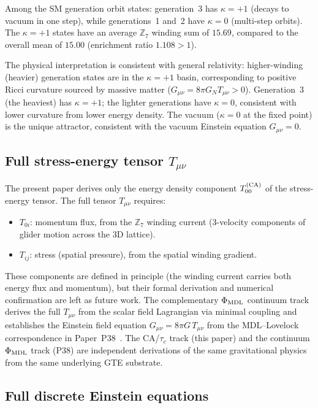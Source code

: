 \documentclass[11pt]{article}
\theoremstyle{remark}
\begin{document}
Among the SM generation orbit states:
generation~3 has $\kappa = +1$ (decays to vacuum in one step),
while generations~1 and~2 have $\kappa = 0$ (multi-step orbits).
The $\kappa = +1$ states have an average $\mathbb{Z}_7$ winding sum of
$15.69$, compared to the overall mean of $15.00$
(enrichment ratio $1.108 > 1$).

The physical interpretation is consistent with general relativity:
higher-winding (heavier) generation states are in the $\kappa = +1$ basin,
corresponding to positive Ricci curvature sourced by massive matter
($G_{\mu\nu} = 8\pi G_N T_{\mu\nu} > 0$).
Generation~3 (the heaviest) has $\kappa = +1$; the lighter generations
have $\kappa = 0$, consistent with lower curvature from lower energy density.
The vacuum ($\kappa = 0$ at the fixed point) is the unique attractor,
consistent with the vacuum Einstein equation $G_{\mu\nu} = 0$.

\subsection{Full stress-energy tensor \texorpdfstring{$T_{\mu\nu}$}{T\_\{mu nu\}}}
\label{ssec:full_tmunu}

The present paper derives only the energy density component $T_{00}^{(\rm CA)}$
of the stress-energy tensor.
The full tensor $T_{\mu\nu}$ requires:
\begin{itemize}[leftmargin=2em]
\item $T_{0i}$: momentum flux, from the $\mathbb{Z}_7$ winding current
(3-velocity components of glider motion across the 3D lattice).
\item $T_{ij}$: stress (spatial pressure), from the spatial winding gradient.
\end{itemize}
These components are defined in principle (the winding current carries both
energy flux and momentum), but their formal derivation and numerical
confirmation are left as future work.
The complementary $\Phi_{\rm MDL}$ continuum track derives the full
$T_{\mu\nu}$ from the scalar field Lagrangian via minimal coupling and
establishes the Einstein field equation
$G_{\mu\nu} = 8\pi G\, T_{\mu\nu}$ from the MDL--Lovelock correspondence
in Paper~P38~\cite{SpivackPhiMDLGravity}.
The CA/$\tau_c$ track (this paper) and the continuum $\Phi_{\rm MDL}$ track
(P38) are independent derivations of the same gravitational physics from
the same underlying GTE substrate.

\subsection{Full discrete Einstein equations}
\label{ssec:full_EE}
\end{document}
